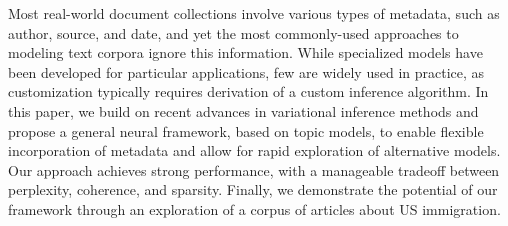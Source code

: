Most real-world document collections involve various types of metadata, such as author, source, and date, and yet the most commonly-used approaches to modeling text corpora ignore this information. While specialized models have been developed for particular applications, few are widely used in practice, as customization typically requires derivation of a custom inference algorithm. In this paper, we build on recent advances in variational inference methods and propose a general neural framework, based on topic models, to enable flexible incorporation of metadata and allow for rapid exploration of alternative models. Our approach achieves strong performance, with a manageable tradeoff between perplexity, coherence, and sparsity. Finally, we demonstrate the potential of our framework through an exploration of a corpus of articles about US immigration.
